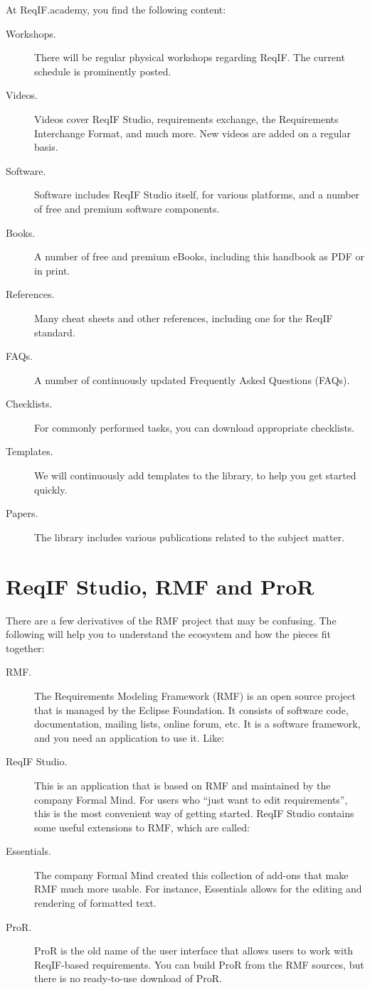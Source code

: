 At ReqIF.academy, you find the following content:

\begin{description}
\item[Workshops.] There will be regular physical workshops regarding ReqIF. The current schedule is prominently posted.
\item[Videos.] Videos cover ReqIF Studio, requirements exchange, the Requirements Interchange Format, and much more. New videos are added on a regular basis.
\item[Software.] Software includes ReqIF Studio itself, for various platforms, and a number of free and premium software components.
\item[Books.] A number of free and premium eBooks, including this handbook as PDF or in print.
\item[References.] Many cheat sheets and other references, including one for the ReqIF standard.
\item[FAQs.] A number of continuously updated Frequently Asked Questions (FAQs).
\item[Checklists.] For commonly performed tasks, you can download appropriate checklists.
\item[Templates.] We will continuously add templates to the library, to help you get started quickly.
\item[Papers.] The library includes various publications related to the subject matter.
\end{description}  

\section{ReqIF Studio, RMF and ProR}
\label{sec:rmf_derivatives}

There are a few derivatives of the RMF project that may be confusing.  The following will
help you to understand the ecosystem and how the pieces fit together:

\begin{description}
\item[RMF.] The Requirements Modeling Framework (RMF) is an open source project that is managed by the Eclipse Foundation.  It consists of software code, documentation, mailing lists, online forum, etc. It is a software framework, and you need an application to use it. Like:
\item[ReqIF Studio.] This is an application that is based on RMF and maintained by the company Formal Mind.  For users who ``just want to edit requirements'', this is the most convenient way of getting started. ReqIF Studio contains some useful extensions to RMF, which are called:
\item[Essentials.] The company Formal Mind created this collection of add-ons that make RMF much more usable.  For instance, Essentials allows for the editing and rendering of formatted text.
\item[ProR.] ProR is the old name of the user interface that allows users to work with ReqIF-based requirements.  You can build ProR from the RMF sources, but there is no ready-to-use download of ProR.
\end{description}

